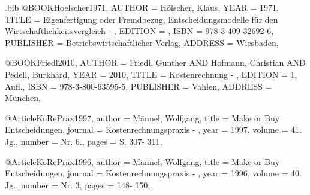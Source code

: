\begin{filecontents}{\jobname.bib}
	@BOOK{Hoelscher1971,
		AUTHOR = {Hölscher, Klaus},
		YEAR = {1971},
		TITLE = {Eigenfertigung oder Fremdbezug, Entscheidungsmodelle für den Wirtschaftlichkeitsvergleich - },
		EDITION = {},
		ISBN = {978-3-409-32692-6},
		PUBLISHER = {Betriebswirtschaftlicher Verlag},
		ADDRESS = {Wiesbaden},
	}
	
	@BOOK{Friedl2010,
		AUTHOR = {Friedl, Gunther AND Hofmann, Christian AND Pedell, Burkhard},
		YEAR = {2010},
		TITLE = {Kostenrechnung - },
		EDITION = {1. Aufl.},
		ISBN = {978-3-800-63595-5},
		PUBLISHER = {Vahlen},
		ADDRESS = {München},
	}
	
	@Article{KoRePrax1997,
		author = {Männel, Wolfgang},
		title = {Make or Buy Entscheidungen},
		journal = {Kostenrechnungspraxis - },
		year = {1997},
		volume = {41. Jg.},
		number = {Nr. 6.},
		pages = {S. 307- 311},
	}
	
	@Article{KoRePrax1996,
		author = {Männel, Wolfgang},
		title = {Make or Buy Entscheidungen},
		journal = {Kostenrechnungspraxis - },
		year = {1996},
		volume = {40. Jg.},
		number = {Nr. 3},
		pages = {148- 150},
	}
\end{filecontents}


\documentclass[paper=a4,fontsize=11pt,parskip=half]{scrartcl}


\usepackage[utf8]{inputenc}
\usepackage[T1]{fontenc}
\usepackage{graphicx}
\usepackage{titlesec}
\usepackage{listings}
\usepackage{setspace}
\usepackage{xcolor}
\usepackage{color}
\usepackage{pgf}
\usepackage{enumitem}
\usepackage[ngerman]{babel}
\usepackage[autostyle=true,german=quotes]{csquotes}
\usepackage[acronym,hyperfirst=false]{glossaries}
\usepackage[colorlinks]{hyperref}
\usepackage{acronym}
\usepackage[colorinlistoftodos,prependcaption]{todonotes}
\usepackage{soul}
\usepackage{subcaption}
\usepackage{fancyhdr}
\usepackage{hyperref}
\usepackage{biblatex}

\hypersetup{
	colorlinks=true,%
}

\makeatletter
\if@todonotes@disabled
\newcommand{\hlnote}[2]{#1}
\else
\newcommand{\hlnote}[2]{\todo{#2}\texthl{#1}}
\fi
\makeatother

\titlespacing*{\section} {0pt}{0ex}{0ex}
\titlespacing*{\subsection} {0pt}{0ex}{0ex}
\titlespacing*{\subsubsection} {0pt}{0ex}{0ex}

